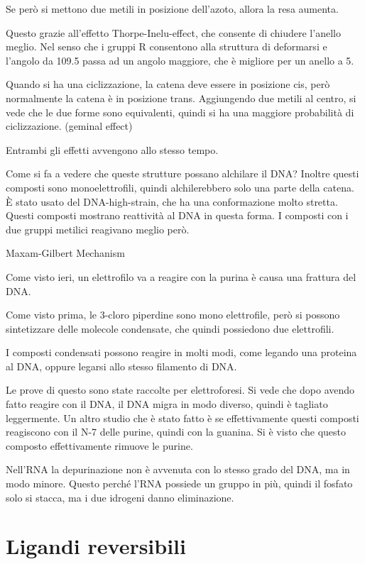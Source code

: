 Se però si mettono due metili in posizione \beta dell'azoto, allora la
resa aumenta.

Questo grazie all'effetto Thorpe-Inelu-effect, che consente di chiudere
l'anello meglio. Nel senso che i gruppi R consentono alla struttura di
deformarsi e l'angolo da 109.5 passa ad un angolo maggiore, che è
migliore per un anello a 5.

Quando si ha una ciclizzazione, la catena deve essere in posizione cis,
però normalmente la catena è in posizione trans. Aggiungendo due metili
al centro, si vede che le due forme sono equivalenti, quindi si ha una
maggiore probabilità di ciclizzazione. (geminal effect)

Entrambi gli effetti avvengono allo stesso tempo.

Come si fa a vedere che queste strutture possano alchilare il DNA?
Inoltre questi composti sono monoelettrofili, quindi alchilerebbero solo
una parte della catena.
È stato usato del DNA-high-strain, che ha una conformazione molto
stretta.
Questi composti mostrano reattività al DNA in questa forma. I composti
con i due gruppi metilici reagivano meglio però.


Maxam-Gilbert Mechanism

Come visto ieri, un elettrofilo va a reagire con la purina è causa una
frattura del DNA.

Come visto prima, le 3-cloro piperdine sono mono elettrofile, però si
possono sintetizzare delle molecole condensate, che quindi possiedono
due elettrofili.

I composti condensati possono reagire in molti modi, come legando una
proteina al DNA, oppure legarsi allo stesso filamento di DNA.

Le prove di questo sono state raccolte per elettroforesi. Si vede che
dopo avendo fatto reagire con il DNA, il DNA migra in modo diverso,
quindi è tagliato leggermente.
Un altro studio che è stato fatto è se effettivamente questi composti
reagiscono con il N-7 delle purine, quindi con la guanina.
Si è visto che questo composto effettivamente rimuove le purine.

Nell'RNA la depurinazione non è avvenuta con lo stesso grado del DNA, ma
in modo minore. Questo perché l'RNA possiede un gruppo  in più,
quindi il fosfato solo si stacca, ma i due idrogeni danno eliminazione.

\section{Ligandi reversibili}

